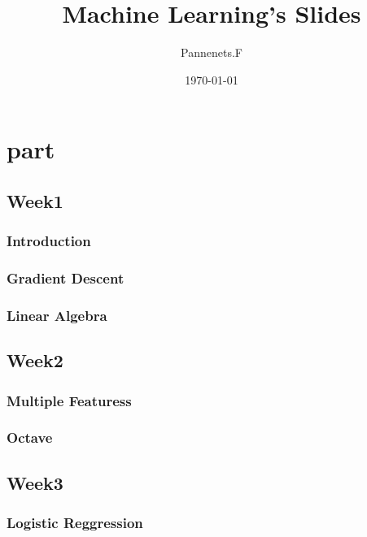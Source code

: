 \documentclass[en,11pt,english,black,simple,device=ppt]{elegantbook}
\title{Machine Learning's Slides}
\author{Pannenets.F}
\date{\today}
\begin{document}
\maketitle
\frontmatter

\tableofcontents

\mainmatter

\part{part}

\chapter{Week1}

\section{Introduction}




\section{Gradient Descent}




\section{Linear Algebra}




\chapter{Week2}

\section{Multiple Featuress}




\section{Octave}




\chapter{Week3}

\section{Logistic Reggression}





\end{document}
